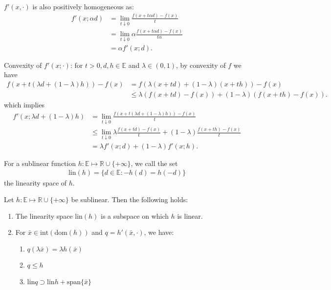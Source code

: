 \documentclass{tufte-handout}
\begin{document}
\( f'(x,\cdot) \) is also positively homogeneous as:
\begin{align}
    f'(x; \alpha d) &= \lim_{t\downarrow 0} \frac{f(x + t\alpha d) - f(x)}{t} \\
    &= \lim_{t\downarrow 0} \alpha \frac{f(x + t\alpha d) - f(x)}{t\alpha} \\
    &= \alpha f'(x; d).
\end{align}

Convexity of \( f'(x; \cdot) \):
for \( t>0, d,h \in \mathbb{E} \) and \( \lambda \in (0,1) \), 
by convexity of \( f \) we have
\begin{align}
    f(x + t(\lambda d + (1-\lambda) h)) -f(x) 
    &= f(\lambda (x + td) + (1-\lambda)(x + th)) - f(x) \\
    &\le 
    \lambda (f(x + td) - f(x)) + (1-\lambda)(f(x + th) - f(x)).
\end{align}
which implies
\begin{align}
    f'(x; \lambda d + (1-\lambda) h) &= \lim_{t\downarrow 0} \frac{f(x + t(\lambda d + (1-\lambda) h)) - f(x)}{t} \\
    &\le \lim_{t\downarrow 0} \lambda \frac{f(x + td) - f(x)}{t} + (1-\lambda)\frac{f(x + th) - f(x)}{t} \\
    &= \lambda f'(x; d) + (1-\lambda) f'(x; h).
\end{align}
\hfill\qedsymbol

\begin{Definition}
    For a sublinear function \( h:\mathbb{E}\mapsto \mathbb{R}\cup \{+\infty\} \), we call the set
    \begin{align}
        \text{lin}(h) = \{ d \in \mathbb{E} :- h(d) = h(-d)  \}
    \end{align}
    the linearity space of \( h \).
\end{Definition}

\begin{Lemma}
    Let \( h:\mathbb{E}\mapsto \mathbb{R}\cup \{+\infty\} \) be sublinear. Then 
    the following holds:
    \begin{enumerate}
        \item The linearity space \( \text{lin}(h) \) is a subspace on which \( h \) is linear.
        \item For \( \bar x \in \text{int}(\text{dom}(h)) \) and \( q=h'(\bar x, \cdot) \), we have:
        \begin{enumerate}
            \item \(q(\lambda \bar x) = \lambda h(\bar x)\) 
            \item \( q\leq h \)
            \item \(\text{lin} q \supset \text{lin} h + \text{span}\{\bar x\}\)
        \end{enumerate}
    \end{enumerate}
\end{Lemma}
\end{document}

